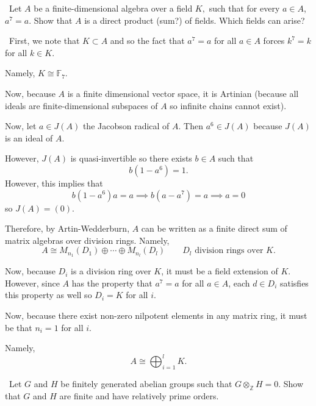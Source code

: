 \documentclass[12pt]{AlgebraQual}
\begin{document}
\begin{problem} $\,$
Let $A$ be a finite-dimensional algebra over a field $K,$ such that for every $a\in A$, $a^7=a$. Show that $A$ is a direct product (sum?) of fields. Which fields can arise?
\end{problem}


\begin{solution}$\,$
First, we note that $K\subset A$ and so the fact that $a^7=a$ for all $a\in A$ forces $k^7=k$ for all $k\in K$.

Namely, $K\cong\mathbb{F}_7$.

Now, because $A$ is a finite dimensional vector space, it is Artinian (because all ideals are finite-dimensional subspaces of $A$ so infinite chains cannot exist).

Now, let $a\in J(A)$ the Jacobson radical of $A$. Then $a^6\in J(A)$ because $J(A)$ is an ideal of $A$.

However, $J(A)$ is quasi-invertible so there exists $b\in A$ such that $$b(1-a^6)=1.$$ However, this implies that $$b(1-a^6)a=a\implies b(a-a^7)=a\implies a=0$$ so $J(A)=(0)$.

Therefore, by Artin-Wedderburn, $A$ can be written as a finite direct sum of matrix algebras over division rings. Namely, $$A\cong M_{n_1}(D_1)\oplus\cdots\oplus M_{n_l}(D_l)\qquad D_l\text{ division rings over }K.$$

Now, because $D_i$ is a division ring over $K$, it must be a field extension of $K$. However, since $A$ has the property that $a^7=a$ for all $a\in A$, each $d\in D_i$ satisfies this property as well so $D_i=K$ for all $i$.

Now, because there exist non-zero nilpotent elements in any matrix ring, it must be that $n_i=1$ for all $i$.

Namely, $$A\cong\bigoplus_{i=1}^lK.$$
\end{solution}
\newpage

\begin{problem} $\,$
Let $G$ and $H$ be finitely generated abelian groups such that $G\otimes_\mathbb{Z}H=0$. Show that $G$ and $H$ are finite and have relatively prime orders.
\end{problem}
\end{document}
